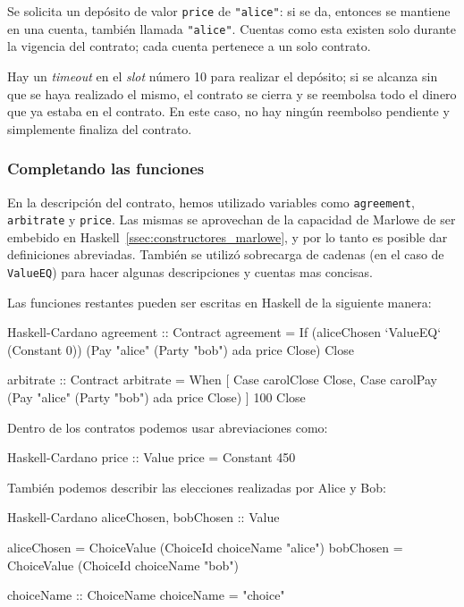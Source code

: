 \documentclass[12pt]{book}
\begin{document}
Se solicita un depósito de valor \texttt{price} de \texttt{"{}alice"{}}: si se da, entonces se mantiene en una cuenta, también llamada \texttt{"{}alice"{}}. Cuentas como esta existen solo durante la vigencia del contrato; cada cuenta pertenece a un solo contrato. %

Hay un \textit{timeout} en el \textit{slot} número 10 para realizar el depósito; si se alcanza sin que se haya realizado el mismo, el contrato se cierra y se reembolsa todo el dinero que ya estaba en el contrato. En este caso, no hay ningún reembolso pendiente y simplemente finaliza del contrato.

\subsubsection{Completando las funciones}
En la descripción del contrato, hemos utilizado variables como \texttt{agreement}, \texttt{arbitrate} y \texttt{price}. Las mismas se aprovechan de la capacidad de Marlowe de ser embebido en Haskell~\ref{ssec:constructores_marlowe}, y por lo tanto es posible dar definiciones abreviadas. También se utilizó sobrecarga de cadenas (en el caso de \texttt{ValueEQ}) para hacer algunas descripciones y cuentas mas concisas.

Las funciones restantes pueden ser escritas en Haskell de la siguiente manera:

\begin{code}[title=Funciones \texttt{agreement} y \texttt{arbitrate}.]{Haskell-Cardano}
agreement :: Contract
agreement =
  If
    (aliceChosen `ValueEQ` (Constant 0))
    (Pay "alice" (Party "bob") ada price Close)
    Close

arbitrate :: Contract
arbitrate =
  When  [ Case carolClose Close,
          Case carolPay (Pay "alice" (Party "bob") ada price Close) ]
        100
        Close
\end{code}

Dentro de los contratos podemos usar abreviaciones como:

\begin{code}[title=Funcion \texttt{price}.]{Haskell-Cardano}
price :: Value
price = Constant 450
\end{code}


También podemos describir las elecciones realizadas por Alice y Bob:

\begin{code}[title=Definicion de las elecciones.]{Haskell-Cardano}
aliceChosen, bobChosen :: Value

aliceChosen = ChoiceValue (ChoiceId choiceName "alice")
bobChosen   = ChoiceValue (ChoiceId choiceName "bob")

choiceName :: ChoiceName
choiceName = "choice"
\end{code}
\end{document}
